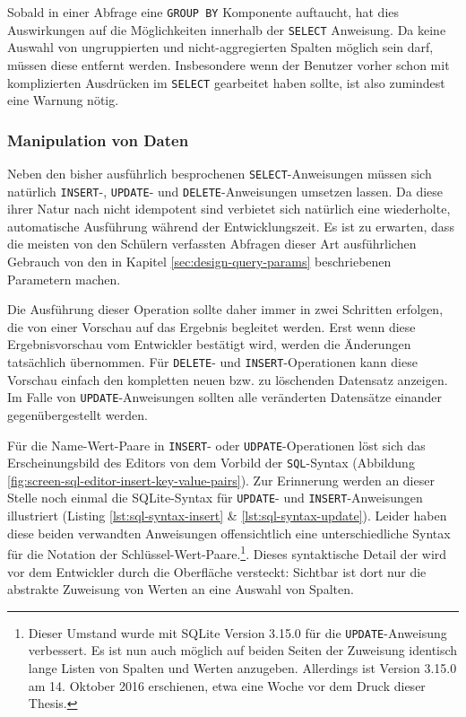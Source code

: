 Sobald in einer Abfrage eine \texttt{GROUP BY} Komponente auftaucht, hat dies Auswirkungen auf die Möglichkeiten innerhalb der \texttt{SELECT} Anweisung. Da keine Auswahl von ungruppierten und nicht-aggregierten Spalten möglich sein darf, müssen diese entfernt werden. Insbesondere wenn der Benutzer vorher schon mit komplizierten Ausdrücken im \texttt{SELECT} gearbeitet haben sollte, ist also zumindest eine Warnung nötig.

\subsubsection{Manipulation von Daten}

Neben den bisher ausführlich besprochenen \texttt{SELECT}-Anweisungen müssen sich natürlich \texttt{INSERT}-, \texttt{UPDATE}- und \texttt{DELETE}-Anweisungen umsetzen lassen. Da diese ihrer Natur nach nicht idempotent sind verbietet sich natürlich eine wiederholte, automatische Ausführung während der Entwicklungszeit. Es ist zu erwarten, dass die meisten von den Schülern verfassten Abfragen dieser Art ausführlichen Gebrauch von den in Kapitel \ref{sec:design-query-params} beschriebenen Parametern machen.

Die Ausführung dieser Operation sollte daher immer in zwei Schritten erfolgen, die von einer Vorschau auf das Ergebnis begleitet werden. Erst wenn diese Ergebnisvorschau vom Entwickler bestätigt wird, werden die Änderungen tatsächlich übernommen. Für \texttt{DELETE}- und \texttt{INSERT}-Operationen kann diese Vorschau einfach den kompletten neuen bzw. zu löschenden Datensatz anzeigen. Im Falle von \texttt{UPDATE}-Anweisungen sollten alle veränderten Datensätze einander gegenübergestellt werden.

Für die Name-Wert-Paare in \texttt{INSERT}- oder \texttt{UDPATE}-Operationen löst sich das Erscheinungsbild des Editors von dem Vorbild der \texttt{SQL}-Syntax (Abbildung  \ref{fig:screen-sql-editor-insert-key-value-pairs}). Zur Erinnerung werden an dieser Stelle noch einmal die SQLite-Syntax für \texttt{UPDATE}- und \texttt{INSERT}-Anweisungen illustriert (Listing \ref{lst:sql-syntax-insert} \& \ref{lst:sql-syntax-update}). Leider haben diese beiden verwandten Anweisungen offensichtlich eine unterschiedliche Syntax für die Notation der Schlüssel-Wert-Paare.\footnote{Dieser Umstand wurde mit SQLite Version 3.15.0 für die \texttt{UPDATE}-Anweisung verbessert. Es ist nun auch möglich auf beiden Seiten der Zuweisung identisch lange Listen von Spalten und Werten anzugeben. Allerdings ist Version 3.15.0 am 14. Oktober 2016 erschienen, etwa eine Woche vor dem Druck dieser Thesis.}. Dieses syntaktische Detail der wird vor dem Entwickler durch die Oberfläche versteckt: Sichtbar ist dort nur die abstrakte Zuweisung von Werten an eine Auswahl von Spalten.

